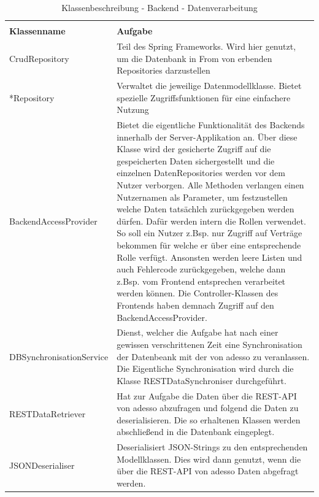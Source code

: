 \centering
\begin{longtable}[h]{p{5cm} p{9cm}}
	\caption{Klassenbeschreibung - Backend - Datenverarbeitung}
	\label{table:klassenbeschreibung-backend-data}
	\endlastfoot
	\multicolumn{2}{r}{{Weitergeführt auf der folgenden Seite}} \\
	\endfoot
	\endhead
	\rowcolor[HTML]{C0C0C0} 
	\textbf{Klassenname} & \textbf{Aufgabe} \\
	CrudRepository & Teil des Spring Frameworks. Wird hier genutzt, um die Datenbank in From von erbenden Repositories darzustellen \\
	\rowcolor[HTML]{E7E7E7} 
	*Repository & Verwaltet die jeweilige Datenmodellklasse. Bietet spezielle Zugriffsfunktionen für eine einfachere Nutzung \\
	BackendAccessProvider & Bietet die eigentliche Funktionalität des Backends innerhalb der Server-Applikation an. Über diese Klasse wird der gesicherte Zugriff auf die gespeicherten Daten sichergestellt und die 
    einzelnen DatenRepositories werden vor dem Nutzer verborgen. Alle Methoden verlangen einen Nutzernamen als Parameter, um festzustellen welche Daten tatsächlch zurückgegeben werden dürfen. Dafür werden intern die Rollen verwendet.
    So soll ein Nutzer z.Bsp. nur Zugriff auf Verträge bekommen für welche er über eine entsprechende Rolle verfügt. Ansonsten werden leere Listen und auch Fehlercode zurückgegeben, welche dann z.Bsp. vom Frontend
    entsprechen verarbeitet werden können. Die Controller-Klassen des Frontends haben demnach Zugriff auf den BackendAccessProvider. \\
	\rowcolor[HTML]{E7E7E7} 
	DBSynchronisationService & Dienst, welcher die Aufgabe hat nach einer gewissen verschrittenen Zeit eine Synchronisation der Datenbeank mit der von adesso zu veranlassen. Die Eigentliche Synchronisation wird
    durch die Klasse RESTDataSynchroniser durchgeführt. \\
    RESTDataRetriever & Hat zur Aufgabe die Daten über die REST-API von adesso abzufragen und folgend die Daten zu deserialisieren. Die so erhaltenen Klassen werden abschließend in die Datenbank eingeplegt. \\
	\rowcolor[HTML]{E7E7E7} 
    JSONDeserialiser & Deserialisiert JSON-Strings zu den entsprechenden Modellklassen. Dies wird dann genutzt, wenn die über die REST-API von adesso Daten abgefragt werden. \\
\end{longtable}